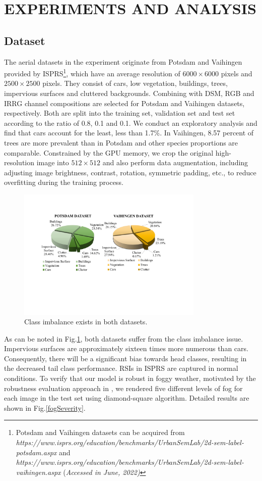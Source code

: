 \documentclass[lettersize,journal]{IEEEtran}
\begin{document}
\section{EXPERIMENTS AND ANALYSIS}
\subsection{Dataset}\label{sec:dataset}
The aerial datasets in the experiment originate from Potsdam and Vaihingen provided by ISPRS\footnote{Potsdam and Vaihingen datasets can be acquired from \emph{https://www.isprs.org/education/benchmarks/UrbanSemLab/2d-sem-label-potsdam.aspx} and \emph{https://www.isprs.org/education/benchmarks/UrbanSemLab/2d-sem-label-vaihingen.aspx} (\emph{{Accessed in June, 2022})}}, which have an average resolution of $6000\times 6000$ pixels and $2500\times 2500$ pixels. They consist of cars, low vegetation, buildings, trees, impervious surfaces and cluttered backgrounds. Combining with DSM, RGB and IRRG channel compositions are selected for Potsdam and Vaihingen datasets, respectively. Both are split into the training set, validation set and test set according to the ratio of 0.8, 0.1 and 0.1. We conduct an exploratory analysis and find that cars account for the least, less than 1.7\%. In Vaihingen, 8.57 percent of trees are more prevalent than in Potsdam and other species proportions are comparable. Constrained by the GPU memory, we crop the original high-resolution image into $512\times 512$ and also perform data augmentation, including adjusting image brightness, contrast, rotation, symmetric padding, etc., to reduce overfitting during the training process. 
\begin{figure}[!htbp]
    \centering
    \includegraphics[width=3.5in]{dataset.pdf}
    \caption{Class imbalance exists in both datasets.}
    \label{imbalance}
    \vspace{-0.2cm}
\end{figure}
As can be noted in Fig.\ref{imbalance}, both datasets suffer from the class imbalance issue. Impervious surfaces are approximately sixteen times more numerous than cars. Consequently, there will be a significant bias towards head classes, resulting in the decreased tail class performance. RSIs in ISPRS are captured in normal conditions. To verify that our model is robust in foggy weather, motivated by the robustness evaluation approach in \cite{kamannBenchmarkingRobustnessSemantic2021}, we rendered five different levels of fog for each image in the test set using diamond-square algorithm. Detailed results are shown in Fig.\ref{fogSeverity}. 
\end{document}
